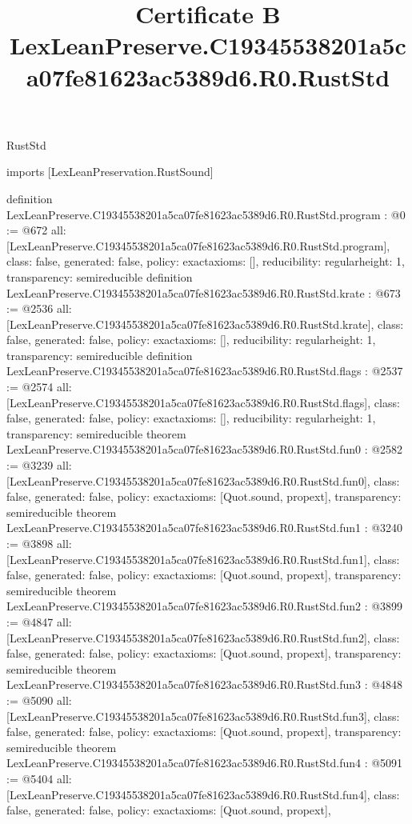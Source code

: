 \begin{lexlean}{RustStd}
\title{Certificate B LexLeanPreserve.C19345538201a5ca07fe81623ac5389d6.R0.RustStd}
\begin{coremodule}
imports [LexLeanPreservation.RustSound]

definition LexLeanPreserve.C19345538201a5ca07fe81623ac5389d6.R0.RustStd.program : @0 := @672 {
  all: [LexLeanPreserve.C19345538201a5ca07fe81623ac5389d6.R0.RustStd.program],
  class: false,
  generated: false,
  policy: exact{axioms: []},
  reducibility: regular{height: 1},
  transparency: semireducible
}
definition LexLeanPreserve.C19345538201a5ca07fe81623ac5389d6.R0.RustStd.krate : @673 := @2536 {
  all: [LexLeanPreserve.C19345538201a5ca07fe81623ac5389d6.R0.RustStd.krate],
  class: false,
  generated: false,
  policy: exact{axioms: []},
  reducibility: regular{height: 1},
  transparency: semireducible
}
definition LexLeanPreserve.C19345538201a5ca07fe81623ac5389d6.R0.RustStd.flags : @2537 := @2574 {
  all: [LexLeanPreserve.C19345538201a5ca07fe81623ac5389d6.R0.RustStd.flags],
  class: false,
  generated: false,
  policy: exact{axioms: []},
  reducibility: regular{height: 1},
  transparency: semireducible
}
theorem LexLeanPreserve.C19345538201a5ca07fe81623ac5389d6.R0.RustStd.fun0 : @2582 := @3239 {
  all: [LexLeanPreserve.C19345538201a5ca07fe81623ac5389d6.R0.RustStd.fun0],
  class: false,
  generated: false,
  policy: exact{axioms: [Quot.sound, propext]},
  transparency: semireducible
}
theorem LexLeanPreserve.C19345538201a5ca07fe81623ac5389d6.R0.RustStd.fun1 : @3240 := @3898 {
  all: [LexLeanPreserve.C19345538201a5ca07fe81623ac5389d6.R0.RustStd.fun1],
  class: false,
  generated: false,
  policy: exact{axioms: [Quot.sound, propext]},
  transparency: semireducible
}
theorem LexLeanPreserve.C19345538201a5ca07fe81623ac5389d6.R0.RustStd.fun2 : @3899 := @4847 {
  all: [LexLeanPreserve.C19345538201a5ca07fe81623ac5389d6.R0.RustStd.fun2],
  class: false,
  generated: false,
  policy: exact{axioms: [Quot.sound, propext]},
  transparency: semireducible
}
theorem LexLeanPreserve.C19345538201a5ca07fe81623ac5389d6.R0.RustStd.fun3 : @4848 := @5090 {
  all: [LexLeanPreserve.C19345538201a5ca07fe81623ac5389d6.R0.RustStd.fun3],
  class: false,
  generated: false,
  policy: exact{axioms: [Quot.sound, propext]},
  transparency: semireducible
}
theorem LexLeanPreserve.C19345538201a5ca07fe81623ac5389d6.R0.RustStd.fun4 : @5091 := @5404 {
  all: [LexLeanPreserve.C19345538201a5ca07fe81623ac5389d6.R0.RustStd.fun4],
  class: false,
  generated: false,
  policy: exact{axioms: [Quot.sound, propext]},
}
\end{coremodule}
\end{lexlean}
